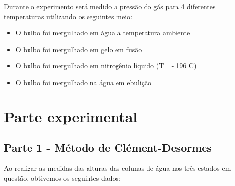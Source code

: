 \documentclass[a4paper]{ltxdoc}
\numberwithin{equation}{section}
\begin{document}
 \vspace{\baselineskip}

Durante o experimento será medido a pressão do gás para 4 diferentes temperaturas utilizando os seguintes meio:

\vspace{\baselineskip}

\begin{itemize}
    \item O bulbo foi mergulhado em água à temperatura ambiente
    \item O bulbo foi mergulhado em gelo em fusão 
    \item O bulbo foi mergulhado em nitrogênio líquido (T= - 196 C)
    \item O bulbo foi mergulhado na água em ebulição
\end{itemize}

\vspace{\baselineskip}







\section{Parte experimental}


\subsection{Parte 1 - Método de Clément-Desormes}

Ao realizar as medidas das alturas das colunas de água nos três estados em questão, obtivemos os seguintes dados:

 \vspace{\baselineskip}
\end{document}
